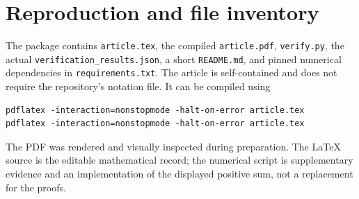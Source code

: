 \documentclass[11pt,a4paper]{article}
\theoremstyle{definition}
\theoremstyle{remark}
\begin{document}
\section{Reproduction and file inventory}
The package contains \texttt{article.tex}, the compiled \texttt{article.pdf},
\texttt{verify.py}, the actual \texttt{verification\_results.json}, a short
\texttt{README.md}, and pinned numerical dependencies in
\texttt{requirements.txt}. The article is self-contained and does not
require the repository's notation file. It can be compiled using
\begin{verbatim}
pdflatex -interaction=nonstopmode -halt-on-error article.tex
pdflatex -interaction=nonstopmode -halt-on-error article.tex
\end{verbatim}
The PDF was rendered and visually inspected during preparation. The
LaTeX source is the editable mathematical record; the numerical script is
supplementary evidence and an implementation of the displayed positive
sum, not a replacement for the proofs.
\end{document}
